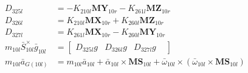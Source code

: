 \begin{align}
 \nonumber \\ 
D_{325l} &= - K_{210l}\mathbf{MY}_{10r} - K_{261l}\mathbf{MZ}_{10r} \nonumber \\
D_{326l} &= K_{210l}\mathbf{MX}_{10r} + K_{260l}\mathbf{MZ}_{10r} \nonumber \\
D_{327l} &= K_{261l}\mathbf{MX}_{10r} - K_{260l}\mathbf{MY}_{10r} \nonumber \\
 m_{10l}\bar{S}_{10l}^{\times}\bar{g}_{10l} &= \left[\begin{matrix} D_{325l}g & D_{326l}g & D_{327l}g &  \end{matrix}\right] 
 \nonumber \\ 
 m_{10l}\bar{a}_{G(10l)} &= m_{10l}\bar{a}_{10l} + \bar\alpha_{10l} \times \mathbf{MS}_{10l} + \bar\omega_{10l} \times \left(\bar\omega_{10l} \times \mathbf{MS}_{10l}\right) 
 \nonumber \\ 

\end{align}
